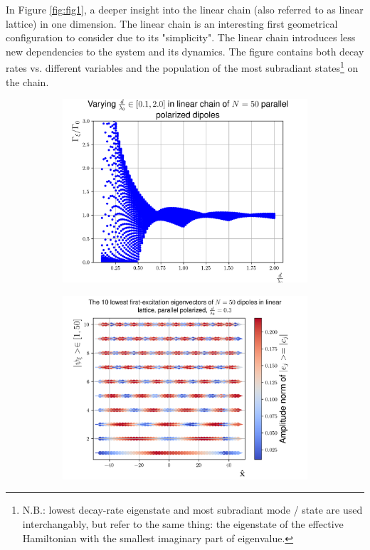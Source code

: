 \documentclass{article}
\begin{document}
In Figure \ref{fig:fig1}, a deeper insight into the linear chain (also referred to as linear lattice) in one dimension. The linear chain is an interesting first geometrical configuration to consider due to its "simplicity". The linear chain introduces less new dependencies to the system and its dynamics. The figure contains both decay rates vs. different variables and the population of the most subradiant states\footnote{N.B.: lowest decay-rate eigenstate and most subradiant mode / state are used interchangably, but refer to the same thing: the eigenstate of the effective Hamiltonian with the smallest imaginary part of eigenvalue.} on the chain. 

\begin{figure}[H]
    \centering
    \begin{subfigure}[b]{0.49\textwidth}
        \includegraphics[width=\textwidth]{figs/case_linear_parallel_var_distance_01_2.png}
        \caption{}
        \label{fig:linear_chain_decayrates_distance_N50}
    \end{subfigure}
    \hfill
    \begin{subfigure}[b]{0.49\textwidth}
        \includegraphics[width=\textwidth]{figs/dipoles_case_linear_parallel_10loweststates.png}
        \caption{}
        \label{fig:linear_chain_10loweststates}
    \end{subfigure}


\end{figure}
\end{document}
